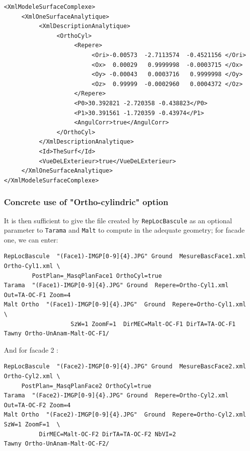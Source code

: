 \begin{verbatim}
<XmlModeleSurfaceComplexe>
     <XmlOneSurfaceAnalytique>
          <XmlDescriptionAnalytique>
               <OrthoCyl>
                    <Repere>
                         <Ori>-0.00573  -2.7113574  -0.4521156 </Ori>
                         <Ox>  0.00029   0.9999998  -0.0003715 </Ox>
                         <Oy> -0.00043   0.0003716   0.9999998 </Oy>
                         <Oz>  0.99999  -0.0002960   0.0004372 </Oz>
                    </Repere>
                    <P0>30.392821 -2.720358 -0.438823</P0>
                    <P1>30.391561 -1.720359 -0.43974</P1>
                    <AngulCorr>true</AngulCorr>
               </OrthoCyl>
          </XmlDescriptionAnalytique>
          <Id>TheSurf</Id>
          <VueDeLExterieur>true</VueDeLExterieur>
     </XmlOneSurfaceAnalytique>
</XmlModeleSurfaceComplexe>
\end{verbatim}

\subsubsection{Concrete use of "Ortho-cylindric" option}

It is then sufficient to give the file created by  {\tt RepLocBascule} 
as an optional parameter to {\tt Tarama} and {\tt Malt} to compute 
in the adequate geometry; for facade one, we can enter:


\begin{verbatim}
RepLocBascule  "(Face1)-IMGP[0-9]{4}.JPG" Ground  MesureBascFace1.xml Ortho-Cyl1.xml \
        PostPlan=_MasqPlanFace1 OrthoCyl=true
Tarama  "(Face1)-IMGP[0-9]{4}.JPG" Ground  Repere=Ortho-Cyl1.xml  Out=TA-OC-F1 Zoom=4
Malt Ortho  "(Face1)-IMGP[0-9]{4}.JPG"  Ground  Repere=Ortho-Cyl1.xml  \
                   SzW=1 ZoomF=1  DirMEC=Malt-OC-F1 DirTA=TA-OC-F1
Tawny Ortho-UnAnam-Malt-OC-F1/
\end{verbatim}

And for facade 2 :

\begin{verbatim}
RepLocBascule  "(Face2)-IMGP[0-9]{4}.JPG" Ground  MesureBascFace2.xml Ortho-Cyl2.xml \
     PostPlan=_MasqPlanFace2 OrthoCyl=true
Tarama  "(Face2)-IMGP[0-9]{4}.JPG" Ground  Repere=Ortho-Cyl2.xml  Out=TA-OC-F2 Zoom=4
Malt Ortho  "(Face2)-IMGP[0-9]{4}.JPG"  Ground  Repere=Ortho-Cyl2.xml  SzW=1 ZoomF=1  \
          DirMEC=Malt-OC-F2 DirTA=TA-OC-F2 NbVI=2
Tawny Ortho-UnAnam-Malt-OC-F2/
\end{verbatim}

